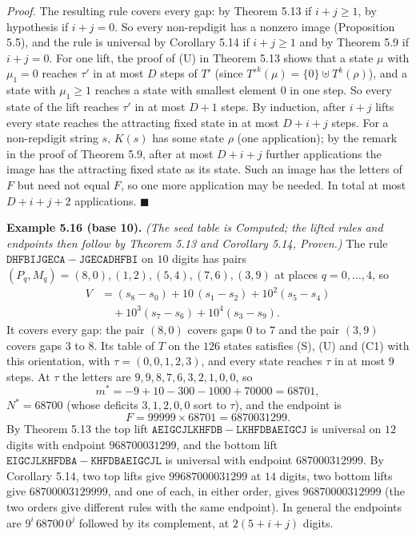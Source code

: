 \documentclass[11pt,letterpaper]{article}
\theoremstyle{paperstyle}
\theoremstyle{paperstyledef}
\theoremstyle{paperstylerem}
\begin{document}
\emph{Proof.} The resulting rule covers every gap: by Theorem 5.13 if \(i + j \ge 1\), by hypothesis if \(i + j = 0\). So every non-repdigit has a nonzero image (Proposition 5.5), and the rule is universal by Corollary 5.14 if \(i + j \ge 1\) and by Theorem 5.9 if \(i + j = 0\). For one lift, the proof of (U) in Theorem 5.13 shows that a state \(\mu\) with \(\mu_1 = 0\) reaches \(\tau'\) in at most \(D\) steps of \(T'\) (since \(T'^k(\mu) = \{0\} \uplus T^k(\rho)\)), and a state with \(\mu_1 \ge 1\) reaches a state with smallest element \(0\) in one step. So every state of the lift reaches \(\tau'\) in at most \(D + 1\) steps. By induction, after \(i + j\) lifts every state reaches the attracting fixed state in at most \(D + i + j\) steps. For a non-repdigit string \(s\), \(K(s)\) has some state \(\rho\) (one application); by the remark in the proof of Theorem 5.9, after at most \(D + i + j\) further applications the image has the attracting fixed state as its state. Such an image has the letters of \(F\) but need not equal \(F\), so one more application may be needed. In total at most \(D + i + j + 2\) applications. \(\blacksquare\)

\textbf{Example 5.16 (base 10).} \emph{(The seed table is Computed; the lifted rules and endpoints then follow by Theorem 5.13 and Corollary 5.14, Proven.)} The rule \(\mathtt{DHFBIJGECA} - \mathtt{JGECADHFBI}\) on \(10\) digits has pairs \((P_q, M_q) = (8,0), (1,2), (5,4), (7,6), (3,9)\) at places \(q = 0, \dots, 4\), so \[\begin{aligned}
V &= (s_8 - s_0) + 10\,(s_1 - s_2) + 10^2 (s_5 - s_4) \\
  &\quad + 10^3 (s_7 - s_6) + 10^4 (s_3 - s_9).
\end{aligned}\] It covers every gap: the pair \((8,0)\) covers gaps \(0\) to \(7\) and the pair \((3,9)\) covers gaps \(3\) to \(8\). Its table of \(T\) on the \(126\) states satisfies (S), (U) and (C1) with this orientation, with \(\tau = (0,0,1,2,3)\), and every state reaches \(\tau\) in at most \(9\) steps. At \(\tau\) the letters are \(9,9,8,7,6,3,2,1,0,0\), so \[m^* = -9 + 10 - 300 - 1000 + 70000 = 68701,\] \(N^* = 68700\) (whose deficits \(3,1,2,0,0\) sort to \(\tau\)), and the endpoint is \[F = 99999 \times 68701 = 6870031299.\] By Theorem 5.13 the top lift \(\mathtt{AEIGCJLKHFDB} - \mathtt{LKHFDBAEIGCJ}\) is universal on \(12\) digits with endpoint \(968700031299\), and the bottom lift \(\mathtt{EIGCJLKHFDBA} - \mathtt{KHFDBAEIGCJL}\) is universal with endpoint \(687000312999\). By Corollary 5.14, two top lifts give \(99687000031299\) at \(14\) digits, two bottom lifts give \(68700003129999\), and one of each, in either order, gives \(96870000312999\) (the two orders give different rules with the same endpoint). In general the endpoints are \(9^i\, 68700\, 0^j\) followed by its complement, at \(2(5+i+j)\) digits.
\end{document}
